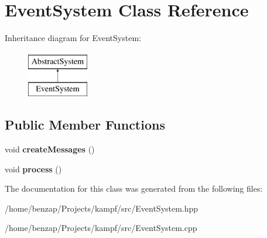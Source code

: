 \hypertarget{classEventSystem}{\section{Event\-System Class Reference}
\label{classEventSystem}
}
Inheritance diagram for Event\-System\-:\begin{figure}[H]
\begin{center}
\leavevmode
\includegraphics[height=2.000000cm]{classEventSystem}
\end{center}
\end{figure}
\subsection*{Public Member Functions}
\begin{DoxyCompactItemize}
\item 
\hypertarget{classEventSystem_ada7f35b578ea481dcba664ebbd806071}{void {\bfseries create\-Messages} ()}\label{classEventSystem_ada7f35b578ea481dcba664ebbd806071}

\item 
\hypertarget{classEventSystem_a28fee03167531b9273e769d0bf34cec5}{void {\bfseries process} ()}\label{classEventSystem_a28fee03167531b9273e769d0bf34cec5}

\end{DoxyCompactItemize}


The documentation for this class was generated from the following files\-:\begin{DoxyCompactItemize}
\item 
/home/benzap/\-Projects/kampf/src/Event\-System.\-hpp\item 
/home/benzap/\-Projects/kampf/src/Event\-System.\-cpp\end{DoxyCompactItemize}
